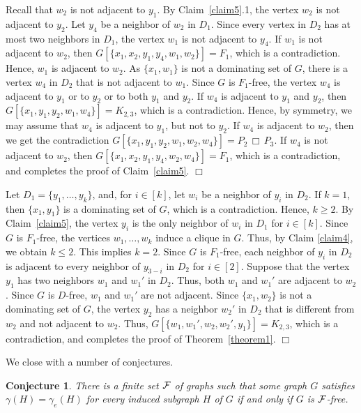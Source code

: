 \documentclass[12pt]{article}
\newtheorem{conjecture}[theorem]{Conjecture}
\newcommand{\cart}{\, \Box \,}
\begin{document}
\medskip

\noindent Recall that $w_2$ is not adjacent to $y_1$. By Claim~\ref{claim5}.1, the vertex $w_2$ is not adjacent to $y_2$. Let $y_4$ be a neighbor of $w_2$ in $D_1$. Since every vertex in $D_2$ has at most two neighbors in $D_1$, the vertex $w_1$ is not adjacent to $y_4$. If $w_1$ is not adjacent to $w_2$, then $G[\{x_1,x_2,y_1,y_4,w_1,w_2\}]=F_1$, which is a contradiction. Hence, $w_1$ is adjacent to $w_2$. 
As $\{x_1, w_1\}$ is not a dominating set of $G$, there is a vertex $w_4$ in $D_2$ that is not adjacent to $w_1$.
Since $G$ is $F_1$-free, the vertex $w_4$ is adjacent to $y_1$ or to $y_2$ or to both $y_1$ and $y_2$.
If $w_4$ is adjacent to $y_1$ and $y_2$, then $G[\{x_1,y_1,y_2,w_1, w_4\}]=K_{2,3}$, which is a contradiction.
Hence, by symmetry, we may assume that $w_4$ is adjacent to $y_1$, but not to $y_2$. 
If $w_4$ is adjacent to $w_2$, then we get the contradiction $G[\{x_1,y_1,y_2,w_1,w_2,w_4\}]=P_2 \cart P_3$.
If $w_4$ is not adjacent to $w_2$, then $G[\{x_1,x_2, y_1,y_4,w_2, w_4\}]=F_1$, which is a contradiction, and completes the proof of Claim~\ref{claim5}.
$\Box$

\medskip

\noindent Let $D_1=\{y_1,\ldots, y_k\}$, and, for $i\in [k]$, let $w_i$ be a neighbor of $y_i$ in $D_2$. 
If $k = 1$, then $\{x_1,y_1\}$ is a dominating set of $G$, which is a contradiction. 
Hence, $k \ge 2$. By Claim~\ref{claim5}, the vertex $y_i$ is the only neighbor of $w_i$ in $D_1$ for $i \in [k]$.
Since $G$ is $F_1$-free, the vertices $w_1,\ldots, w_k$ induce a clique in $G$. 
Thus, by Claim \ref{claim4}, we obtain $k \leq 2$. 
This implies $k=2$.
Since $G$ is $F_1$-free, each neighbor of $y_i$ in $D_2$ is adjacent to every neighbor of $y_{3-i}$ in $D_2$ for $i \in [2]$. Suppose that the vertex $y_1$ has two neighbors $w_1$ and $w_1'$ in $D_2$. Thus, both $w_1$ and $w_1'$ are adjacent to $w_2$. Since $G$ is $D$-free, $w_1$ and $w_1'$ are not adjacent. Since $\{x_1,w_2\}$ is not a dominating set of $G$, the vertex $y_2$ has a neighbor $w_2'$ in $D_2$ that is different from $w_2$ and not adjacent to $w_2$. Thus, $G[\{ w_1,w_1', w_2, w_2', y_1\}]= K_{2,3}$, which is a contradiction, and completes the proof of Theorem~\ref{theorem1}.
$\Box$

\medskip

\noindent We close with a number of conjectures.

\begin{conjecture}\label{conjecture1}
There is a finite set ${\cal F}$ of graphs such that some graph $G$ 
satisfies $\gamma(H) = \gamma_e(H)$ for every induced subgraph $H$ of $G$
if and only if $G$ is ${\cal F}$-free.
\end{conjecture}
\end{document}
